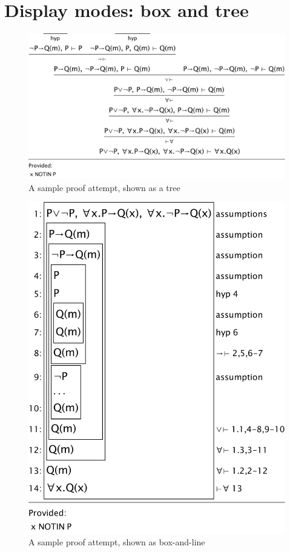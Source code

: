 \chapter{Display modes: box and tree}
\label{chap:boxNtree}

\begin{figure}
\begin{center}
\includegraphics[scale=0.5]{pics/sampletree}
\caption{A sample proof attempt, shown as a tree}
\label{fig:sampletree}
\end{center}
\end{figure}

\begin{figure}
\begin{center}
\includegraphics[scale=0.5]{pics/sampleboxNline}
\caption{A sample proof attempt, shown as box-and-line}
\label{fig:sampleboxNline}
\end{center}
\end{figure}

